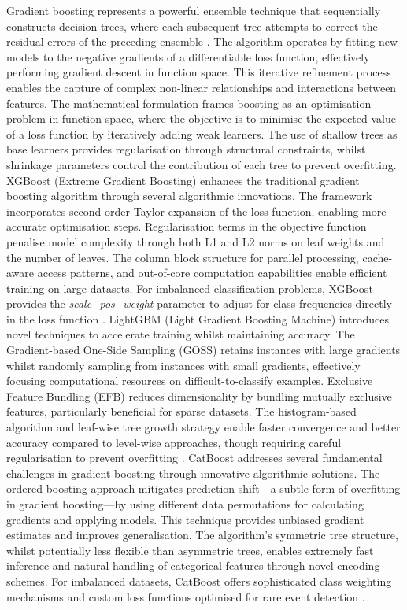 \documentclass[nhess, manuscript]{copernicus}
\begin{document}
Gradient boosting represents a powerful ensemble technique that sequentially constructs decision trees, where each subsequent tree attempts to correct the residual errors of the preceding ensemble \citep{Bentéjac_2021}. The algorithm operates by fitting new models to the negative gradients of a differentiable loss function, effectively performing gradient descent in function space. This iterative refinement process enables the capture of complex non-linear relationships and interactions between features. The mathematical formulation frames boosting as an optimisation problem in function space, where the objective is to minimise the expected value of a loss function by iteratively adding weak learners. The use of shallow trees as base learners provides regularisation through structural constraints, whilst shrinkage parameters control the contribution of each tree to prevent overfitting. XGBoost (Extreme Gradient Boosting) enhances the traditional gradient boosting algorithm through several algorithmic innovations. The framework incorporates second-order Taylor expansion of the loss function, enabling more accurate optimisation steps. Regularisation terms in the objective function penalise model complexity through both L1 and L2 norms on leaf weights and the number of leaves. The column block structure for parallel processing, cache-aware access patterns, and out-of-core computation capabilities enable efficient training on large datasets. For imbalanced classification problems, XGBoost provides the \textit{scale\_pos\_weight} parameter to adjust for class frequencies directly in the loss function \citep{Chen_2016}. LightGBM (Light Gradient Boosting Machine) introduces novel techniques to accelerate training whilst maintaining accuracy. The Gradient-based One-Side Sampling (GOSS) retains instances with large gradients whilst randomly sampling from instances with small gradients, effectively focusing computational resources on difficult-to-classify examples. Exclusive Feature Bundling (EFB) reduces dimensionality by bundling mutually exclusive features, particularly beneficial for sparse datasets. The histogram-based algorithm and leaf-wise tree growth strategy enable faster convergence and better accuracy compared to level-wise approaches, though requiring careful regularisation to prevent overfitting \citep{Ke_2017}. CatBoost addresses several fundamental challenges in gradient boosting through innovative algorithmic solutions. The ordered boosting approach mitigates prediction shift—a subtle form of overfitting in gradient boosting—by using different data permutations for calculating gradients and applying models. This technique provides unbiased gradient estimates and improves generalisation. The algorithm's symmetric tree structure, whilst potentially less flexible than asymmetric trees, enables extremely fast inference and natural handling of categorical features through novel encoding schemes. For imbalanced datasets, CatBoost offers sophisticated class weighting mechanisms and custom loss functions optimised for rare event detection \citep{Prokhorenkova_2018}.
\end{document}
